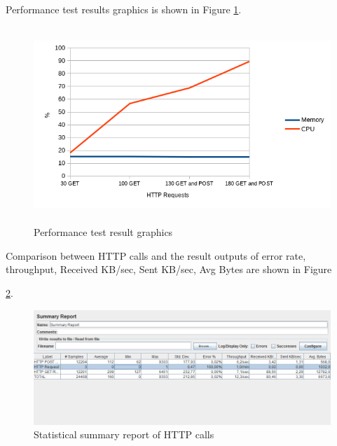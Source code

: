 Performance test results graphics is shown in Figure \ref{fig:performanceGraphic}.

\begin{figure}[!htbp]
\centering
\includegraphics[height = 20em]{projectChapters/images/performanceTestResult.png}
\caption{Performance test result graphics}
\label{fig:performanceGraphic}
\end{figure}

Comparison between HTTP calls and the result outputs of error rate, throughput, Received KB/sec, Sent KB/sec, Avg Bytes are shown in Figure

\ref{fig:summaryReport}.

\begin{figure}[!htbp]
\centering
\includegraphics[width=\textwidth]{projectChapters/images/summaryReport.png}
\caption{Statistical summary report of HTTP calls}
\label{fig:summaryReport}
\end{figure}












